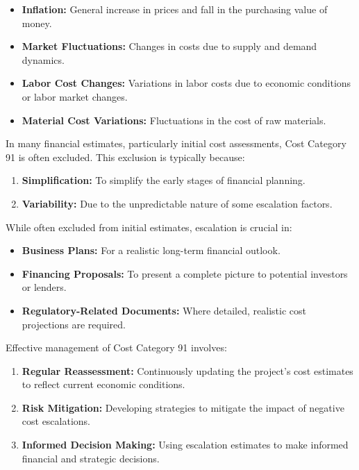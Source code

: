 \begin{itemize}
    \item \textbf{Inflation:} General increase in prices and fall in the purchasing value of money.
    \item \textbf{Market Fluctuations:} Changes in costs due to supply and demand dynamics.
    \item \textbf{Labor Cost Changes:} Variations in labor costs due to economic conditions or labor market changes.
    \item \textbf{Material Cost Variations:} Fluctuations in the cost of raw materials.
\end{itemize}

In many financial estimates, particularly initial cost assessments, Cost Category 91 is often excluded. This exclusion is typically because:

\begin{enumerate}
    \item \textbf{Simplification:} To simplify the early stages of financial planning.
    \item \textbf{Variability:} Due to the unpredictable nature of some escalation factors.
\end{enumerate}

While often excluded from initial estimates, escalation is crucial in:

\begin{itemize}
    \item \textbf{Business Plans:} For a realistic long-term financial outlook.
    \item \textbf{Financing Proposals:} To present a complete picture to potential investors or lenders.
    \item \textbf{Regulatory-Related Documents:} Where detailed, realistic cost projections are required.
\end{itemize}

Effective management of Cost Category 91 involves:

\begin{enumerate}
    \item \textbf{Regular Reassessment:} Continuously updating the project's cost estimates to reflect current economic conditions.
    \item \textbf{Risk Mitigation:} Developing strategies to mitigate the impact of negative cost escalations.
    \item \textbf{Informed Decision Making:} Using escalation estimates to make informed financial and strategic decisions.
\end{enumerate}



